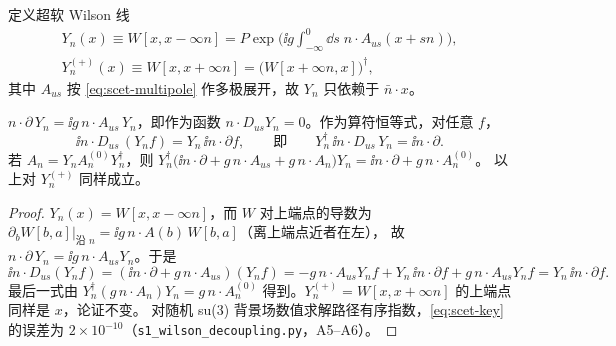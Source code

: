 定义超软 Wilson 线
\begin{equation}\label{eq:scet-Yn}
\begin{gathered}
Y_n(x)\equiv W[x,x-\infty n]=P\exp\Big(\ii g\int_{-\infty}^0\dd s\;n\cdot A_{us}(x+sn)\Big),\\
Y_n^{(+)}(x)\equiv W[x,x+\infty n]=\big(W[x+\infty n,x]\big)^\dagger ,
\end{gathered}
\end{equation}
其中 $A_{us}$ 按 \cref{eq:scet-multipole} 作多极展开，故 $Y_n$ 只依赖于 $\bar n\cdot x$。

\begin{lemma}[关键恒等式]\tagR\label{lem:scet-key}
$n\cdot\partial\,Y_n=\ii g\,n\cdot A_{us}\,Y_n$，即作为函数 $n\cdot D_{us}Y_n=0$。作为算符恒等式，对任意 $f$，
\begin{equation}\label{eq:scet-key}
\ii n\cdot D_{us}\,(Y_nf)=Y_n\,\ii n\cdot\partial f,\qquad\text{即}\qquad Y_n^\dagger\,\ii n\cdot D_{us}\,Y_n=\ii n\cdot\partial .
\end{equation}
若 $A_n=Y_nA_n^{(0)}Y_n^\dagger$，则 $Y_n^\dagger\big(\ii n\cdot\partial+g\,n\cdot A_{us}+g\,n\cdot A_n\big)Y_n=\ii n\cdot\partial+g\,n\cdot A_n^{(0)}$。
以上对 $Y_n^{(+)}$ 同样成立。
\end{lemma}

\begin{proof}
$Y_n(x)=W[x,x-\infty n]$，而 $W$ 对上端点的导数为 $\partial_bW[b,a]\big|_{\text{沿 }n}=\ii g\,n\cdot A(b)\,W[b,a]$（离上端点近者在左），
故 $n\cdot\partial\,Y_n=\ii g\,n\cdot A_{us}Y_n$。于是
\[
\ii n\cdot D_{us}(Y_nf)=(\ii n\cdot\partial+g\,n\cdot A_{us})(Y_nf)
=-g\,n\cdot A_{us}Y_nf+Y_n\,\ii n\cdot\partial f+g\,n\cdot A_{us}Y_nf=Y_n\,\ii n\cdot\partial f .
\]
最后一式由 $Y_n^\dagger(g\,n\cdot A_n)Y_n=g\,n\cdot A_n^{(0)}$ 得到。$Y_n^{(+)}=W[x,x+\infty n]$ 的上端点同样是 $x$，论证不变。
对随机 su(3) 背景场数值求解路径有序指数，\cref{eq:scet-key} 的误差为 $2\times10^{-10}$（\texttt{s1\_\allowbreak wilson\_\allowbreak decoupling.py}，A5–A6）。
\end{proof}

